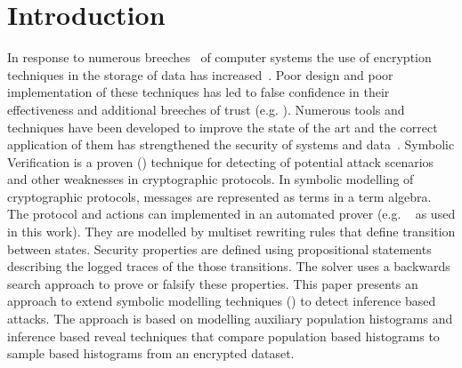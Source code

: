 \documentclass[journal]{IEEEtran}
\begin{document}


\section{Introduction}
In response to numerous breeches~\cite{StateOfIS} of computer systems the use of encryption techniques in the storage of data has increased~\cite{Raghavendra2016}. Poor design and poor implementation of these techniques has led to false confidence in their effectiveness and additional breeches of trust (e.g. \cite{NewSouthWales}).
Numerous tools and techniques have been developed to improve the state of the  art and the correct application of them has strengthened the security of systems and data~\cite{SOK2017}.  
Symbolic Verification is a proven (\cite{Meier2013, 5GAKA, 18XOR}) technique for detecting of potential attack scenarios and other weaknesses in cryptographic protocols.
In symbolic modelling of cryptographic protocols, messages are represented as terms in a term algebra. The protocol and actions can implemented in an automated prover (e.g. \tamarin{}~\cite{Meyer2012} as used in this work). They are modelled by multiset rewriting rules that define transition between states. Security properties are defined using propositional statements describing the logged traces of the those transitions. The solver uses a backwards search approach to prove or falsify these properties. 
This paper presents an approach to extend symbolic modelling techniques (\cite{Meier2013, ObsEqvCCS15}) to detect inference based attacks. The approach is based on modelling auxiliary population histograms and inference based reveal techniques that compare  population based histograms to sample based histograms from an encrypted dataset.
\end{document}

